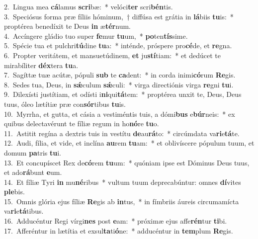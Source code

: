 {2.~}Lingua mea \textbf{cá}lamus \textbf{scri}bæ:~* velóci\textbf{ter} scri\textbf{bén}tis.\\
{3.~}Speciósus forma præ fíliis hóminum,~† diffúsa est grátia in \textbf{lá}biis \textbf{tu}is:~* proptérea benedíxit te Deus \textbf{in} æ\textbf{tér}num.\\
{4.~}Accíngere gládio tuo super \textbf{fe}mur \textbf{tu}um,~* \textbf{po}ten\textbf{tís}sime.\\
{5.~}Spécie tua et pulchri\textbf{tú}dine \textbf{tu}a:~* inténde, próspere pro\textbf{cé}de, et \textbf{re}gna.\\
{6.~}Propter veritátem, et mansuetúdinem, \textbf{et} ju\textbf{stí}tiam:~* et dedúcet te mirabíliter \textbf{déx}tera \textbf{tu}a.\\
{7.~}Sagíttæ tuæ acútæ, pópuli \textbf{sub} te \textbf{ca}dent:~* in corda inimi\textbf{có}rum \textbf{Re}gis.\\
{8.~}Sedes tua, Deus, in \textbf{sǽ}culum \textbf{sǽ}culi:~* virga directiónis virga \textbf{re}gni \textbf{tu}i.\\
{9.~}Dilexísti justítiam, et odísti i\textbf{ni}qui\textbf{tá}tem:~* proptérea unxit te, Deus, Deus tuus, óleo lætítiæ præ con\textbf{sór}tibus \textbf{tu}is.\\
{10.~}Myrrha, et gutta, et cásia a vestiméntis tuis, a dómi\textbf{bus} e\textbf{búr}neis:~* ex quibus delectavérunt te fíliæ regum in ho\textbf{nó}re \textbf{tu}o.\\
{11.~}Astitit regína a dextris tuis in vestítu \textbf{de}au\textbf{rá}to:~* circúmdata va\textbf{ri}e\textbf{tá}te.\\
{12.~}Audi, fília, et vide, et inclína \textbf{au}rem \textbf{tu}am:~* et oblivíscere pópulum tuum, et domum \textbf{pa}tris \textbf{tu}i.\\
{13.~}Et concupíscet Rex de\textbf{có}rem \textbf{tu}um:~* quóniam ipse est Dóminus Deus tuus, et ado\textbf{rá}bunt \textbf{e}um.\\
{14.~}Et fíliæ Tyri \textbf{in} mu\textbf{né}ribus~* vultum tuum deprecabúntur: omnes \textbf{dí}vites \textbf{ple}bis.\\
{15.~}Omnis glória ejus fíliæ \textbf{Re}gis ab \textbf{in}tus,~* in fímbriis áureis circumamícta va\textbf{ri}e\textbf{tá}tibus.\\
{16.~}Adducéntur Regi vírgi\textbf{nes} post \textbf{e}am:~* próximæ ejus affe\textbf{rén}tur \textbf{ti}bi.\\
{17.~}Afferéntur in lætítia et exsul\textbf{ta}ti\textbf{ó}ne:~* adducéntur in \textbf{tem}plum \textbf{Re}gis.\\
